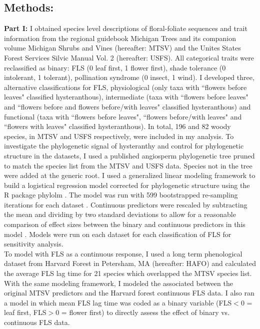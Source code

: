 \documentclass{article}\usepackage[]{graphicx}\usepackage[]{color}
\begin{document}
\subsection*{Methods:}
\indent\indent\textbf{Part I:} I obtained species level descriptions of floral-foliate sequences and trait information from the regional guidebook Michigan Trees \citep{Barnes2004} and its companion volume Michigan Shrubs and Vines \citep{Barnes2016} (hereafter: MTSV) and the Unites States Forest Services Silvic Manual Vol. 2 \citep{Burns1990} (hereafter: USFS). All categorical traits were reclassified as binary: FLS (0 leaf first, 1 flower first), shade tolerance (0 intolerant, 1 tolerant), pollination syndrome (0 insect, 1 wind). I developed three, alternative classifications for FLS, physiological (only taxa with ``flowers before leaves" classified hysteranthous), intermediate (taxa with ``flowers before leaves" and ``flowers before and flowers before/with leaves" classified hysteranthous) and functional (taxa with ``flowers before leaves", ``flowers before/with leaves" and ``flowers with leaves" classified hysteranthous). In total, 196 and 82 woody species, in MTSV and USFS respectively, were included in my analysis. To investigate the phylogenetic signal of hysteranthy and control for phylogenetic structure in the datasets, I used a published angiosperm phylogenetic tree \citep{Zanne2013} pruned to match the species list from the MTSV and USFS data. Species not in the tree were added at the generic root. I used  a generalized linear modeling framework \citep{Ives2010} to build a logistical regression model corrected for phylogenetic structure using the R package phylolm \citep{Ho2014}. The model was run with 599 bootstrapped re-sampling iterations for each dataset \citep{Wilcox2010}. Continuous predictors were rescaled by subtracting the mean and dividing by two standard deviations to allow for a reasonable comparison of effect sizes between the binary and continuous predictors in this model \citep{Gelman2007}. Models were run on each dataset for each classification of FLS for sensitivity analysis.\\ 
\indent To model with FLS as a continuous response, I used a long term phenological dataset from Harvard Forest in Petersham, MA \citep{Okeefe2015} (hereafter: HAFO)  and calculated the average FLS lag time for 21 species which overlapped the MTSV species list. With the same modeling framework, I modeled the associated between the original MTSV predictors and the Harvard forest continuous FLS data. I also ran a model in which mean FLS lag time was coded as a binary variable (FLS$<0$ = leaf first, FLS$>0$ = flower first) to directly assess the effect of binary vs. continuous FLS data.\\
\end{document}
